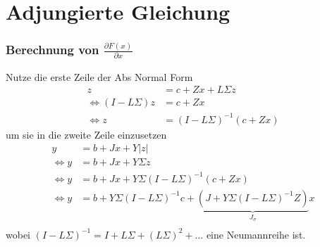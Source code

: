 \section[Adjungierte Gleichung]{Adjungierte Gleichung}

\begin{frame}[<+->]
\frametitle{Berechnung von $\frac{\partial F(x)}{\partial x}$}
Nutze die erste Zeile der Abs Normal Form
\begin{align*}
z &= c+Zx + L\Sigma z \\
\iff (I-L\Sigma)z &= c+Zx  \\
\iff z &= (I-L\Sigma)^{-1}(c+Zx) 
\end{align*}
\pause
um sie in die zweite Zeile einzusetzen
\begin{align*}
y &= b+ Jx + Y|z| \\
\iff y &= b+ Jx + Y\Sigma z \\
\iff y &= b+ Jx + Y\Sigma (I-L\Sigma)^{-1}(c+Zx) \\
\iff y &= b+  Y\Sigma (I-L\Sigma)^{-1}c + \underbrace{(J + Y\Sigma (I-L\Sigma)^{-1}Z)}_{J_\sigma} x \\
\end{align*}
\vspace*{1cm}
wobei $(I-L\Sigma)^{-1} = I +L\Sigma + (L\Sigma)^2+\ldots$ eine Neumannreihe ist.
\end{frame}

